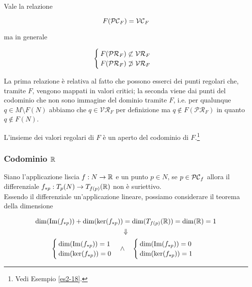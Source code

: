 \begin{remark}
	Vale la relazione
	
	\begin{equation}
		F(\mathcal{PC}_{F}) = \mathcal{VC}_{F}
	\end{equation}

	ma in generale
	
	\begin{equation}
		\begin{cases}
			F(\mathcal{PR}_{F}) \not\subset \mathcal{VR}_{F}\\
			F(\mathcal{PR}_{F}) \not\supset \mathcal{VR}_{F}
		\end{cases}
	\end{equation}

	La prima relazione è relativa al fatto che possono esserci dei punti regolari che, tramite $ F $, vengono mappati in valori critici; la seconda viene dai punti del codominio che non sono immagine del dominio tramite $ F $, i.e. per qualunque $ q \in M \setminus F(N) $ abbiamo che $ q \in \mathcal{VR}_{F} $ per definizione ma $ q \notin F(\mathcal{PR}_{F}) $ in quanto $ q \notin F(N) $.
\end{remark}

\begin{remark}
	L'insieme dei valori regolari di $ F $ è un aperto del codominio di $ F $.\footnote{%
		Vedi Esempio \ref{es2-18}.%
	}
\end{remark}

\subsubsection{Codominio $ \mathbb{R} $}

Siano l'applicazione liscia $ f : N \to \mathbb{R} $ e un punto $ p \in N $, se $ p \in \mathcal{PC}_{f} $ allora il differenziale $ f_{*p} : T_{p}(N) \to T_{f(p)}(\mathbb{R}) $ non è suriettivo.\\
Essendo il differenziale un'applicazione lineare, possiamo considerare il teorema della dimensione

\begin{gather}
	\dim(\Im(f_{*p})) + \dim(\ker(f_{*p})) = \dim(T_{f(p)}(\R)) = \dim(\R) = 1 \\%
	\Downarrow \nonumber \\%
	\begin{cases}
		\dim(\Im(f_{*p})) = 1\\
		\dim(\ker(f_{*p})) = 0
	\end{cases} %
	\wedge \quad
	\begin{cases}
		\dim(\Im(f_{*p})) = 0\\
		\dim(\ker(f_{*p})) = 1
	\end{cases}
\end{gather}

